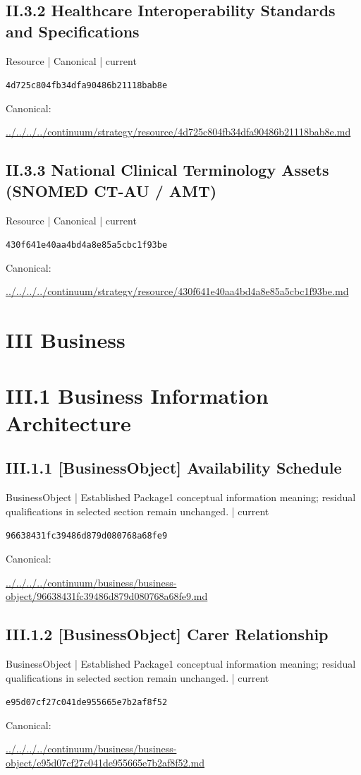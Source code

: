 \documentclass[10pt,a4paper]{article}
\begin{document}
\subsection*{II.3.2 Healthcare Interoperability Standards and Specifications}
\label{element-4d725c804fb34dfa90486b21118bab8e}
{\small Resource | Canonical | current}\par
\texttt{4d725c804fb34dfa90486b21118bab8e}\par
Canonical: \par
{\footnotesize\url{../../../../continuum/strategy/resource/4d725c804fb34dfa90486b21118bab8e.md}}\par
\subsection*{II.3.3 National Clinical Terminology Assets (SNOMED CT-AU / AMT)}
\label{element-430f641e40aa4bd4a8e85a5cbc1f93be}
{\small Resource | Canonical | current}\par
\texttt{430f641e40aa4bd4a8e85a5cbc1f93be}\par
Canonical: \par
{\footnotesize\url{../../../../continuum/strategy/resource/430f641e40aa4bd4a8e85a5cbc1f93be.md}}\par
\section*{III Business}
\section*{III.1 Business Information Architecture}
\subsection*{III.1.1 [BusinessObject] Availability Schedule}
\label{element-96638431fc39486d879d080768a68fe9}
{\small BusinessObject | Established Package1 conceptual information meaning; residual qualifications in selected section remain unchanged. | current}\par
\texttt{96638431fc39486d879d080768a68fe9}\par
Canonical: \par
{\footnotesize\url{../../../../continuum/business/business-object/96638431fc39486d879d080768a68fe9.md}}\par
\subsection*{III.1.2 [BusinessObject] Carer Relationship}
\label{element-e95d07cf27c041de955665e7b2af8f52}
{\small BusinessObject | Established Package1 conceptual information meaning; residual qualifications in selected section remain unchanged. | current}\par
\texttt{e95d07cf27c041de955665e7b2af8f52}\par
Canonical: \par
{\footnotesize\url{../../../../continuum/business/business-object/e95d07cf27c041de955665e7b2af8f52.md}}\par
\end{document}
